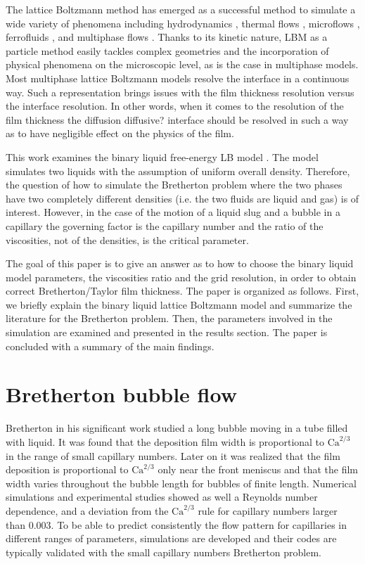\documentclass{article}
\newcommand{\Ca}{\mathrm{Ca}}
\newcommand{\todo}[1]{{\color{red}#1}}
\begin{document}
The lattice Boltzmann method has emerged as a successful method to simulate
a wide variety of phenomena including hydrodynamics \cite{yu}, thermal flows
\cite{karlin-minimalmodels}, microflows \cite{ansumali-small-knudsen},
ferrofluids \cite{kuzmin-aniso}, and multiphase flows
\cite{swift,Shan-chen:extended}. Thanks to its kinetic nature, LBM as a particle
method easily tackles complex geometries and the incorporation of
physical phenomena on the microscopic level, as is the case in multiphase models. Most
multiphase lattice Boltzmann models \cite{swift, Shan-chen:extended} resolve
the interface in a continuous way. Such a representation
brings issues with the film thickness resolution versus the interface
resolution. In other words, when it comes to the resolution of the film
thickness the diffusion \todo{diffusive?} interface should be resolved in such a way as to have
negligible effect on the physics of the film.

This work examines the binary liquid free-energy LB model \cite{swift}. The
model simulates two liquids with the assumption of uniform overall
density. Therefore, the question of how to simulate the Bretherton problem
where the two phases have two completely different densities (i.e. the two fluids
are liquid and gas) is of interest. However, in the case of the motion of a
liquid slug and a bubble in a capillary the governing factor is the capillary number
and the ratio of the viscosities, not of the densities, is the critical parameter.

The goal of this paper is to give an answer as to how to choose the
binary liquid model parameters, the viscosities ratio and the grid
resolution, in order to obtain correct Bretherton/Taylor film thickness.
The paper is organized as follows.  First, we briefly
explain the binary liquid lattice Boltzmann model and summarize the literature
for the Bretherton problem. Then, the parameters involved in the
simulation are examined and presented in the results section. The paper is
concluded with a summary of the main findings.

\section{Bretherton bubble flow}
Bretherton in his significant work \cite{bretherton} studied a long bubble
moving in a tube filled with liquid. It was found that the deposition film width
is proportional to $\Ca^{2/3}$ in the range of small capillary numbers. Later on
it was realized \cite{wong-films,wong-pressure} that the film deposition
is proportional to $\Ca^{2/3}$ only near the front meniscus and that the film width
varies throughout the bubble length for bubbles of finite length. Numerical
simulations \cite{giavedoni-numerical} and experimental studies
\cite{kreutzer-pressure-drop} showed as well a Reynolds number dependence, and
a deviation from the $\Ca^{2/3}$ rule for capillary numbers larger than $0.003$.
To be able to predict consistently the flow pattern for capillaries in
different ranges of parameters, simulations are developed and their codes
are typically validated with the small capillary numbers Bretherton problem.
\end{document}
